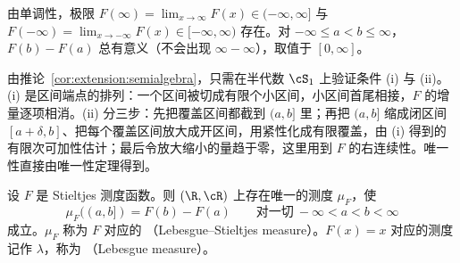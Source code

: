 由单调性，极限 $F(\infty)=\lim_{x\to\infty}F(x)\in(-\infty,\infty]$ 与 $F(-\infty)=\lim_{x\to-\infty}F(x)\in[-\infty,\infty)$ 存在。对 $-\infty\leqslant a<b\leqslant\infty$，$F(b)-F(a)$ 总有意义（不会出现 $\infty-\infty$），取值于 $[0,\infty]$。

\begin{remark}[证明思路]
由推论~\ref{cor:extension:semialgebra}，只需在半代数 $\cS_1$ 上验证条件 (i) 与 (ii)。(i) 是区间端点的排列：一个区间被切成有限个小区间，小区间首尾相接，$F$ 的增量逐项相消。(ii) 分三步：先把覆盖区间都截到 $(a,b]$ 里；再把 $(a,b]$ 缩成闭区间 $[a+\delta,b]$、把每个覆盖区间放大成开区间，用紧性化成有限覆盖，由 (i) 得到的有限次可加性估计；最后令放大缩小的量趋于零，这里用到 $F$ 的右连续性。唯一性直接由唯一性定理得到。
\end{remark}

\begin{theorem}\label{thm:extension:lebesgue-stieltjes}
设 $F$ 是 Stieltjes 测度函数。则 $(\R,\cR)$ 上存在唯一的测度 $\mu_F$，使
\[
\mu_F((a,b])=F(b)-F(a)\qquad\text{对一切}\ -\infty<a<b<\infty
\]
成立。$\mu_F$ 称为 $F$ 对应的 （Lebesgue--Stieltjes measure）。$F(x)=x$ 对应的测度记作 $\lambda$，称为 （Lebesgue measure）。
\end{theorem}
